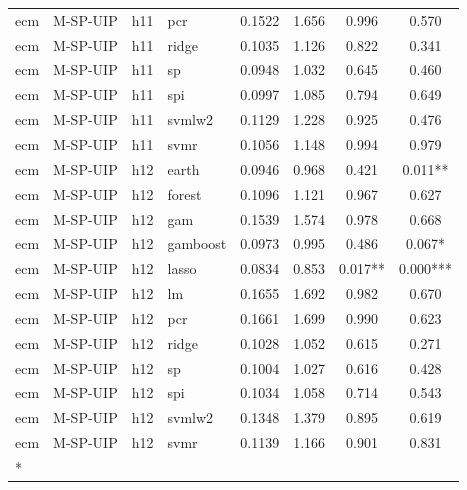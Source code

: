 \begin{ThreePartTable}
\begin{longtable}[t]{llclcccc}
ecm & M-SP-UIP & h11 & pcr & 0.1522 & 1.656 & 0.996 & 0.570\\
ecm & M-SP-UIP & h11 & ridge & 0.1035 & 1.126 & 0.822 & 0.341\\
ecm & M-SP-UIP & h11 & sp & 0.0948 & 1.032 & 0.645 & 0.460\\
ecm & M-SP-UIP & h11 & spi & 0.0997 & 1.085 & 0.794 & 0.649\\
ecm & M-SP-UIP & h11 & svmlw2 & 0.1129 & 1.228 & 0.925 & 0.476\\
ecm & M-SP-UIP & h11 & svmr & 0.1056 & 1.148 & 0.994 & 0.979\\
\addlinespace
ecm & M-SP-UIP & h12 & earth & 0.0946 & 0.968 & 0.421 & 0.011**\\
ecm & M-SP-UIP & h12 & forest & 0.1096 & 1.121 & 0.967 & 0.627\\
ecm & M-SP-UIP & h12 & gam & 0.1539 & 1.574 & 0.978 & 0.668\\
ecm & M-SP-UIP & h12 & gamboost & 0.0973 & 0.995 & 0.486 & 0.067*\\
ecm & M-SP-UIP & h12 & lasso & 0.0834 & 0.853 & 0.017** & 0.000***\\
ecm & M-SP-UIP & h12 & lm & 0.1655 & 1.692 & 0.982 & 0.670\\
ecm & M-SP-UIP & h12 & pcr & 0.1661 & 1.699 & 0.990 & 0.623\\
ecm & M-SP-UIP & h12 & ridge & 0.1028 & 1.052 & 0.615 & 0.271\\
ecm & M-SP-UIP & h12 & sp & 0.1004 & 1.027 & 0.616 & 0.428\\
ecm & M-SP-UIP & h12 & spi & 0.1034 & 1.058 & 0.714 & 0.543\\
ecm & M-SP-UIP & h12 & svmlw2 & 0.1348 & 1.379 & 0.895 & 0.619\\
ecm & M-SP-UIP & h12 & svmr & 0.1139 & 1.166 & 0.901 & 0.831\\*
\end{longtable}
\end{ThreePartTable}
\endgroup{}
